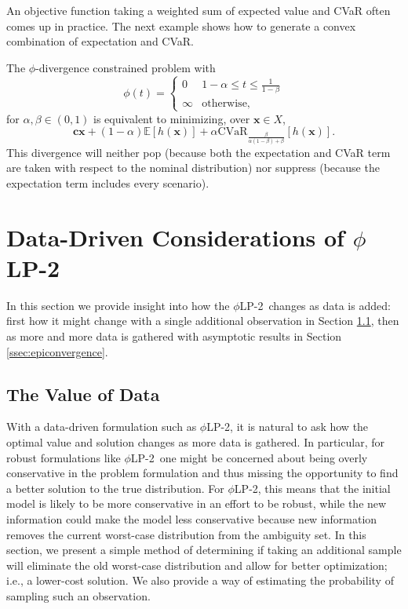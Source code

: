 \documentclass[ijoc,letterpaper]{informs3} %
\newcommand{\E}{\mathbb{E}}
\newcommand{\e}[1]{\E \left[ #1 \right]}
\newcommand{\x}{\mathbf{x}}
\renewcommand{\c}{\mathbf{c}}
\newcommand{\plp}{$\phi$LP-2}
\begin{document}
An objective function taking a weighted sum of expected value and CVaR often comes up in practice.
The next example shows how to generate a convex combination of expectation and CVaR.

\begin{example}
	The $\phi$-divergence constrained problem with
	\[
		\phi(t) = 
		\begin{cases}
			0 & 1-\alpha \leq t \leq \frac{1}{1-\beta} \\
			\infty & \text{otherwise},
		\end{cases}
	\]
	for $\alpha,\beta \in (0,1)$ is equivalent to minimizing, over $\x \in X$,
	\[
		\c\x + (1-\alpha)\e{h(\x)} + \alpha \mbox{CVaR}_{\frac{\beta}{\alpha(1-\beta)+\beta}}[h(\x)].
	\]
	This divergence will neither pop (because both the expectation and CVaR term are taken with respect to the nominal distribution) nor suppress (because the expectation term includes every scenario).
\end{example}

\section{Data-Driven Considerations of \plp}
\label{sec:properties}

In this section we provide insight into how the \plp\ changes as data is added: first how it might change with a single additional observation in Section \ref{ssec:value}, then as more and more data is gathered with asymptotic results in Section \ref{ssec:epiconvergence}.

\subsection{The Value of Data} \label{ssec:value}

With a data-driven formulation such as \plp, it is natural to ask how the optimal value and solution changes as more data is gathered.
In particular, for robust formulations like \plp\ one might be concerned about being overly conservative in the problem formulation and thus missing the opportunity to find a better solution to the true distribution.
For \plp, this means that the initial model is likely to be more conservative in an effort to be robust, while the new information could make the model less conservative because new information removes the current worst-case distribution from the ambiguity set.  
In this section, we present a simple method of determining if taking an additional sample will eliminate the old worst-case distribution and allow for better optimization; i.e., a lower-cost solution.
We also provide a way of estimating the probability of sampling such an observation.
\end{document}
